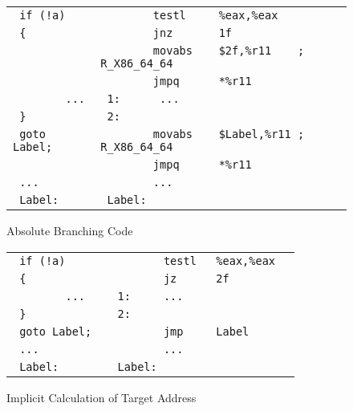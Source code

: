 \begin{figure}[H]
\Hrule
\caption{Absolute Branching Code}\label{large_abs_branching}
\begin{footnotesize}
\begin{tabular}{|l|l|}
\hline
\verb# if (!a)     # & \verb#        testl     %eax,%eax   # \\
\verb# {           # & \verb#        jnz       1f          # \\
\verb#             # & \verb#        movabs    $2f,%r11    ; R_X86_64_64 # \\
\verb#             # & \verb#        jmpq      *%r11       # \\
\verb#        ...  # & \verb# 1:      ...                  # \\
\verb# }           # & \verb# 2:                           # \\
\hline
\verb# goto Label; # & \verb#        movabs    $Label,%r11 ; R_X86_64_64 # \\
\verb#             # & \verb#        jmpq      *%r11       # \\
\verb# ...         # & \verb#        ...                   # \\
\verb# Label:      # & \verb# Label:                       # \\
\hline
\end{tabular}
\end{footnotesize}
\end{figure}

\begin{figure}[H]
\Hrule
\caption{Implicit Calculation of Target Address}\label{large_cal_tgt_addr}
\begin{footnotesize}
\begin{tabular}{|l|l|}
\hline
\verb# if (!a)     # & \verb#        testl   %eax,%eax  # \\
\verb# {           # & \verb#        jz      2f         # \\
\verb#        ...  # & \verb# 1:     ...                # \\
\verb# }           # & \verb# 2:                        # \\
\hline
\verb# goto Label; # & \verb#        jmp     Label      # \\
\verb# ...         # & \verb#        ...                # \\
\verb# Label:      # & \verb# Label:                    # \\
\hline
\end{tabular}
\end{footnotesize}
\end{figure}

